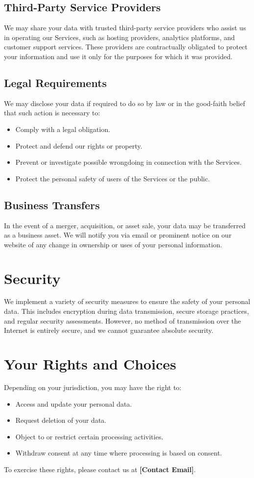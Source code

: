 \documentclass[12pt]{article}
\begin{document}
\subsection{Third-Party Service Providers}
We may share your data with trusted third-party service providers who assist us in operating our Services, such as hosting providers, analytics platforms, and customer support services. These providers are contractually obligated to protect your information and use it only for the purposes for which it was provided.

\subsection{Legal Requirements}
We may disclose your data if required to do so by law or in the good-faith belief that such action is necessary to:
\begin{itemize}
    \item Comply with a legal obligation.
    \item Protect and defend our rights or property.
    \item Prevent or investigate possible wrongdoing in connection with the Services.
    \item Protect the personal safety of users of the Services or the public.
\end{itemize}

\subsection{Business Transfers}
In the event of a merger, acquisition, or asset sale, your data may be transferred as a business asset. We will notify you via email or prominent notice on our website of any change in ownership or uses of your personal information.

\section{Security}
We implement a variety of security measures to ensure the safety of your personal data. This includes encryption during data transmission, secure storage practices, and regular security assessments. However, no method of transmission over the Internet is entirely secure, and we cannot guarantee absolute security.

\section{Your Rights and Choices}
Depending on your jurisdiction, you may have the right to:
\begin{itemize}
    \item Access and update your personal data.
    \item Request deletion of your data.
    \item Object to or restrict certain processing activities.
    \item Withdraw consent at any time where processing is based on consent.
\end{itemize}
To exercise these rights, please contact us at \textbf{[Contact Email]}.
\end{document}
